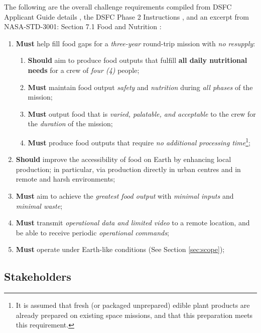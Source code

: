 \documentclass{report}
\begin{document}
The following are the overall challenge requirements compiled from DSFC Applicant Guide details \cite{applicantguide}, the DSFC Phase 2 Instructions \cite{dsfc-phase2}, and an excerpt from NASA-STD-3001: Section 7.1 Food and Nutrition \cite{nutrition}:
\begin{enumerate}[label=R\arabic*., ref=R\arabic*]
    \item \label{r:1} \textbf{Must} help fill food gaps for a \textit{three-year} round-trip mission with \textit{no resupply}:
    \begin{enumerate}[ref=R1\alph*]
        \item \label{r:1a} \textbf{Should} aim to produce food outputs that fulfill \textbf{all daily nutritional needs} for a crew of \textit{four (4)} people;
        \item \label{r:1b} \textbf{Must} maintain food output \textit{safety} and \textit{nutrition} during \textit{all phases} of the mission;
        \item \label{r:1c} \textbf{Must} output food that is \textit{varied, palatable, and acceptable} to the crew for the \textit{duration} of the mission;
        \item \label{r:1d} \textbf{Must} produce food outputs that require \textit{no additional processing 
        time}\footnote{It is assumed that fresh (or packaged unprepared) edible plant products are already prepared on existing space missions, and that this preparation meets this requirement.};
    \end{enumerate}
    \item \label{r:2} \textbf{Should} improve the accessibility of food on Earth by enhancing local production; in particular, via production directly in urban centres and in remote and harsh environments;
    \item \label{r:3} \textbf{Must} aim to achieve the \textit{greatest food output} with \textit{minimal inputs} and \textit{minimal waste};
    \item \label{r:4} \textbf{Must} transmit \textit{operational data and limited video} to a remote location, and be able to receive periodic \textit{operational commands};
    \item \label{r:5} \textbf{Must} operate under Earth-like conditions (See Section \ref{sec:scope});
\end{enumerate}


\subsection{Stakeholders}
\label{sec:stakeholders}
\end{document}
